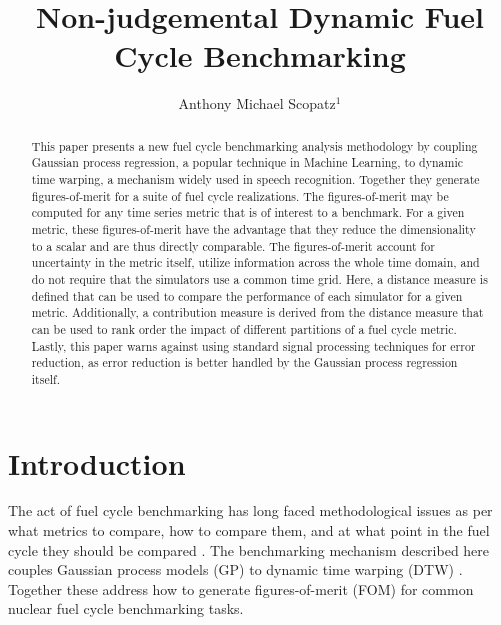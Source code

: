 \documentclass{ntmanuscript}
\title{Non-judgemental Dynamic Fuel Cycle Benchmarking}
\author{Anthony Michael Scopatz$^1$}
\institute{$^1$University of South Carolina, Department of Mechanical
    Engineering, Nuclear Engineering Program, Columbia, SC 29201}
\date{}
\begin{document}
\begin{abstract}
This paper presents a new fuel cycle benchmarking analysis methodology
by coupling Gaussian process regression, a popular technique in Machine
Learning, to dynamic time warping, a mechanism widely used in speech
recognition. Together they generate figures-of-merit for a suite of fuel
cycle realizations. The figures-of-merit may be computed for any time
series metric that is of interest to a benchmark. For a given metric,
these figures-of-merit have the advantage that they reduce the
dimensionality to a scalar and are thus directly comparable.
The figures-of-merit
account for uncertainty in the metric itself, utilize information
across the whole time domain, and do not require that the simulators
use a common time grid. Here, a distance measure is defined that can be used
to compare the performance of each simulator for a given metric. Additionally,
a contribution measure is derived from the distance measure that can be used
to rank order the impact of different partitions of a fuel cycle metric.
Lastly, this paper
warns against using standard signal processing techniques for error reduction,
as error reduction is better handled by the Gaussian process regression
itself.
\end{abstract}

\section{Introduction}
\label{intro}
The act of fuel cycle benchmarking has long faced methodological issues
as per what metrics to compare, how to compare them, and at what point in the
fuel cycle they should be compared
\cite{wilson2011comparing,guerin2009benchmark,piet2011assessment}.
The benchmarking mechanism described
here couples Gaussian process models (GP) \cite{rasmussen2006gaussian} to
dynamic time warping (DTW) \cite{muller}. Together these address how to
generate figures-of-merit (FOM) for common nuclear fuel cycle benchmarking
tasks.
\end{document}
